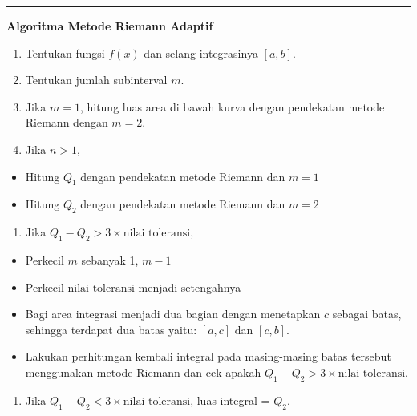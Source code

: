 \documentclass[]{book}
\providecommand{\tightlist}{%
  \setlength{\itemsep}{0pt}\setlength{\parskip}{0pt}}
\theoremstyle{definition}
\theoremstyle{definition}
\theoremstyle{definition}
\theoremstyle{remark}
\begin{document}
\begin{center}\rule{0.5\linewidth}{\linethickness}\end{center}

\textbf{Algoritma Metode Riemann Adaptif}

\begin{enumerate}
\def\labelenumi{\arabic{enumi}.}
\tightlist
\item
  Tentukan fungsi \(f\left(x\right)\) dan selang integrasinya \(\left[a,b\right]\).
\item
  Tentukan jumlah subinterval \(m\).
\item
  Jika \(m=1\), hitung luas area di bawah kurva dengan pendekatan metode Riemann dengan \(m=2\).
\item
  Jika \(n>1\),
\end{enumerate}

\begin{itemize}
\tightlist
\item
  Hitung \(Q_1\) dengan pendekatan metode Riemann dan \(m=1\)
\item
  Hitung \(Q_2\) dengan pendekatan metode Riemann dan \(m=2\)
\end{itemize}

\begin{enumerate}
\def\labelenumi{\arabic{enumi}.}
\setcounter{enumi}{4}
\tightlist
\item
  Jika \(Q_1-Q_2>3\times\text{nilai toleransi}\),
\end{enumerate}

\begin{itemize}
\tightlist
\item
  Perkecil \(m\) sebanyak 1, \(m-1\)
\item
  Perkecil \(\text{nilai toleransi}\) menjadi setengahnya
\item
  Bagi area integrasi menjadi dua bagian dengan menetapkan \(c\) sebagai batas, sehingga terdapat dua batas yaitu: \(\left[a, c\right]\) dan \(\left[c, b\right]\).
\item
  Lakukan perhitungan kembali integral pada masing-masing batas tersebut menggunakan metode Riemann dan cek apakah \(Q_1-Q_2>3\times\text{nilai toleransi}\).
\end{itemize}

\begin{enumerate}
\def\labelenumi{\arabic{enumi}.}
\setcounter{enumi}{5}
\tightlist
\item
  Jika \(Q_1-Q_2<3\times\text{nilai toleransi}\), luas integral = \(Q_2\).
\end{enumerate}
\end{document}
